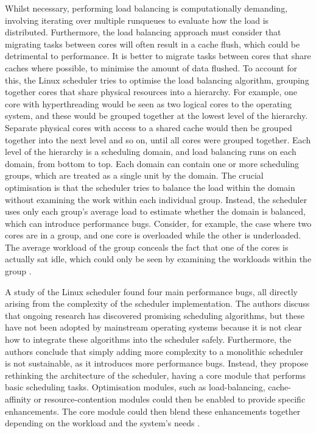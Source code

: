 \documentclass[bsc,frontabs,singlespacing,parskip,deptreport]{infthesis}
\begin{document}
Whilst necessary, performing load balancing is computationally demanding, involving iterating over multiple runqueues to evaluate how the load is distributed. Furthermore, the load balancing approach must consider that migrating tasks between cores will often result in a cache flush, which could be detrimental to performance. It is better to migrate tasks between cores that share caches where possible, to minimise the amount of data flushed. To account for this, the Linux scheduler tries to optimise the load balancing algorithm, grouping together cores that share physical resources into a hierarchy. For example, one core with hyperthreading would be seen as two logical cores to the operating system, and these would be grouped together at the lowest level of the hierarchy. Separate physical cores with access to a shared cache would then be grouped together into the next level and so on, until all cores were grouped together. Each level of the hierarchy is a scheduling domain, and load balancing runs on each domain, from bottom to top. Each domain can contain one or more scheduling groups, which are treated as a single unit by the domain. The crucial optimisation is that the scheduler tries to balance the load within the domain without examining the work within each individual group. Instead, the scheduler uses only each group's average load to estimate whether the domain is balanced, which can introduce performance bugs. Consider, for example, the case where two cores are in a group, and one core is overloaded while the other is underloaded. The average workload of the group conceals the fact that one of the cores is actually sat idle, which could only be seen by examining the workloads within the group \cite{wasted-cores}.

A study of the Linux scheduler found four main performance bugs, all directly arising from the complexity of the scheduler implementation. The authors discuss that ongoing research has discovered promising scheduling algorithms, but these have not been adopted by mainstream operating systems because it is not clear how to integrate these algorithms into the scheduler safely. Furthermore, the authors conclude that simply adding more complexity to a monolithic scheduler is not sustainable, as it introduces more performance bugs. Instead, they propose rethinking the architecture of the scheduler, having a core module that performs basic scheduling tasks. Optimisation modules, such as load-balancing, cache-affinity or resource-contention modules could then be enabled to provide specific enhancements. The core module could then blend these enhancements together depending on the workload and the system's needs \cite{wasted-cores}.
\end{document}
